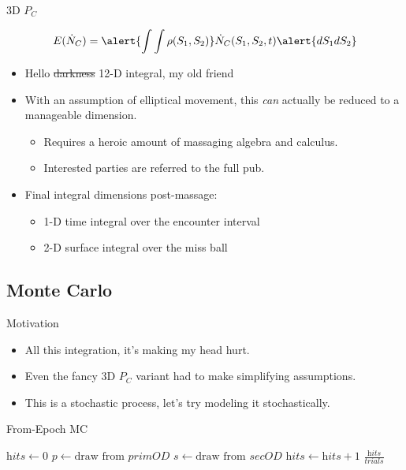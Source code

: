 \documentclass[pdf]{beamer}
\begin{document}
\begin{frame}{3D $P_C$}

  \[ E(\dot{N}_C) = \alert{\int \int \rho(S_1, S_2)} \dot{N}_C(S_1, S_2, t) \alert{dS_1dS_2}\]

  \begin{itemize}
  \item Hello \sout{darkness} 12-D integral, my old friend
  \item With an assumption of elliptical movement, this \emph{can} actually be
    reduced to a manageable dimension.
    \begin{itemize}
    \item Requires a heroic amount of massaging algebra and calculus.
    \item Interested parties are referred to the full pub.
    \end{itemize}
  \item Final integral dimensions post-massage:
    \begin{itemize}
    \item  1-D time integral over the encounter interval
    \item  2-D surface integral over the miss ball
    \end{itemize}
  \end{itemize}
\end{frame}



\subsection{Monte Carlo}

\begin{frame}{Motivation}
  \begin{itemize}
  \item All this integration, it's making my head hurt.
  \item Even the fancy 3D $P_C$ variant had to make simplifying assumptions.
  \item This is a stochastic process, let's try modeling it stochastically.
  \end{itemize}
\end{frame}

\begin{frame}{From-Epoch MC}
  \begin{algorithmic}
    \State $\textit{hits} \gets 0$
    \For{$i \in [0,\ldots,\textit{trials})$}
      \State $p \gets \text{draw from } \textit{primOD}$ 
      \State $s \gets \text{draw from } \textit{secOD}$
        \State $\textit{hits} \gets \textit{hits} + 1$
      \EndIf
      \EndFor
    \State \Return $\frac{\textit{hits}}{\textit{trials}}$
    \EndProcedure  
  \end{algorithmic}
\end{frame}
\end{document}
